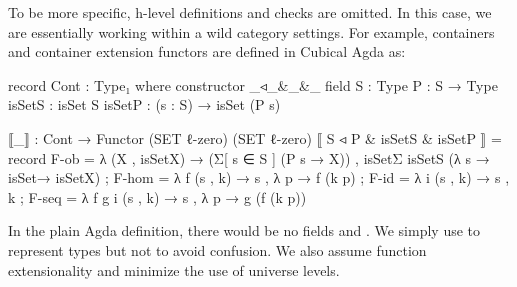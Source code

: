 To be more specific, h-level definitions and checks are omitted. In this case, we are essentially working within a wild category settings. For example, containers and container extension functors are defined in Cubical Agda as:

\begin{code}
record Cont : Type₁ where
  constructor _◃_&_&_
  field
    S : Type
    P : S → Type
    isSetS : isSet S
    isSetP : (s : S) → isSet (P s)

⟦_⟧ : Cont → Functor (SET ℓ-zero) (SET ℓ-zero)
⟦ S ◃ P & isSetS & isSetP ⟧
  = record
  { F-ob = λ (X , isSetX) → 
    (Σ[ s ∈ S ] (P s → X)) , isSetΣ isSetS (λ s → isSet→ isSetX)
  ; F-hom = λ f (s , k) → s , λ p → f (k p)
  ; F-id = λ i (s , k) → s , k
  ; F-seq = λ f g i (s , k) → s , λ p → g (f (k p))
  }
\end{code}

In the plain Agda definition, there would be no fields  and . We simply use  to represent types but not  to avoid confusion. We also assume function extensionality and minimize the use of universe levels.